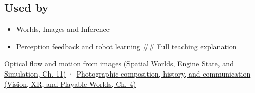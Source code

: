 \subsection{Used by}\label{appendix-e2e73f8cd93e-used-by}

\begin{itemize}
\item
  {Worlds, Images and Inference}
\item
  \hyperref[appendix-b0c42da325f1]{Perception feedback and robot learning} \#\# Full teaching explanation
\end{itemize}

\href{../05-Spatial-Worlds-Engine-State-and-Simulation/main.pdf\#nameddest=04-visual-computing-ii-ch030-optical-flow-and-motion-from-images}{Optical flow and motion from images (Spatial Worlds, Engine State, and Simulation, Ch. 11)} · \href{../07-Vision-XR-and-Playable-Worlds/main.pdf\#nameddest=04-visual-computing-ii-ch034-photographic-composition-history-and-communication}{Photographic composition, history, and communication (Vision, XR, and Playable Worlds, Ch. 4)}
